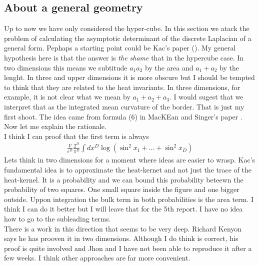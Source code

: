 \documentclass[12pt]{article}
\def\ep{\epsilon}
\begin{document}
\subsection{About a general geometry}
Up to now we have only considered the hyper-cube. In this section we atack the problem of calculating the asymptotic determinant of the discrete Laplacian of a general form. Pephaps a starting point could be Kac's paper (\cite{Kac}). My general hypothesis here is that the answer is \textit{the shame} that in the hypercube case. In two dimensions  this means we subtitude $a_1a_2$ by the area and $a_1+a_2$ by the lenght. In three and upper dimensions it is more obscure but I should be tempted to think that they are related to the heat invariants. In three dimensions, for example, it is not clear what we mean by $a_1+a_2+a_3$. I would sugest that we interpret that as the integrated mean curvature of the border. That is just my first shoot. The idea came from formula (6) in MacKEan and Singer's paper \cite{MacSin}. Now let me explain the rationale.\\
I think I can proof that the first term is always
\begin{gather}
\frac{V}{\ep^D}\frac{2^D}{\pi^D}\int dx^D\log\left(\sin^2 x_1+...+\sin^2 x_D\right)
\end{gather}
Lets think in two dimensions for a moment where ideas are easier to wrasp. Kac's fundamental idea is to approximate the heat-kernet and not just the trace of the heat-kernel. It is a probability and we can bound this probability beteewn the probability of two squares. One small square inside the figure and one bigger outside. Uppon integration the bulk term in both probabilities is the area term. I think I can do it better but I will leave that for the 5th report. I have no idea how to go to the subleading terms.\\
There is a work in this direction that seems to be very deep. Richard Kenyon \cite{Key} says he has prooven it in two dimensions. Although I do think is correct, his proof is quite involved and Jhon and I have not been able to reproduce it after a few weeks. I think other approaches are far more convenient.
\end{document}
